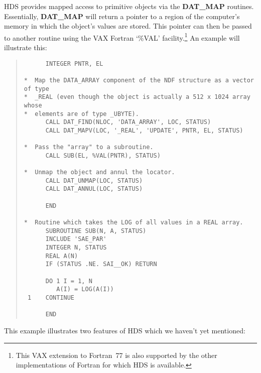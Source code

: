 HDS provides mapped access to primitive objects via the {\bf DAT\_MAP} routines.
Essentially, {\bf DAT\_MAP} will return a pointer to a region of the computer's
memory in which the object's values are stored.
This pointer can then be passed to another routine using the VAX Fortran `\%VAL'
facility.\footnote{This VAX extension to Fortran~77 is also supported by the
other implementations of Fortran for which HDS is available.}
An example will illustrate this: 

\begin{quote}

\begin{small}
\begin{verbatim}
      INTEGER PNTR, EL

*  Map the DATA_ARRAY component of the NDF structure as a vector of type
*  _REAL (even though the object is actually a 512 x 1024 array whose
*  elements are of type _UBYTE).
      CALL DAT_FIND(NLOC, 'DATA_ARRAY', LOC, STATUS)
      CALL DAT_MAPV(LOC, '_REAL', 'UPDATE', PNTR, EL, STATUS)

*  Pass the "array" to a subroutine.
      CALL SUB(EL, %VAL(PNTR), STATUS)

*  Unmap the object and annul the locator.
      CALL DAT_UNMAP(LOC, STATUS)
      CALL DAT_ANNUL(LOC, STATUS)

      END

*  Routine which takes the LOG of all values in a REAL array.
      SUBROUTINE SUB(N, A, STATUS)
      INCLUDE 'SAE_PAR'
      INTEGER N, STATUS
      REAL A(N)
      IF (STATUS .NE. SAI__OK) RETURN

      DO 1 I = 1, N
         A(I) = LOG(A(I))
 1    CONTINUE

      END
\end{verbatim}
\end{small}

\end{quote}
This example illustrates two features of HDS which we haven't yet mentioned:

